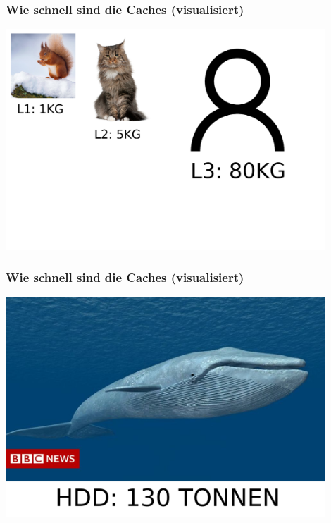 \documentclass{beamer}
\begin{document}
\begin{frame}
\frametitle{Wie schnell sind die Caches (visualisiert)}
\centerline{\includegraphics[width=12cm]{sizes3.png}}
\end{frame}

\begin{frame}
\frametitle{Wie schnell sind die Caches (visualisiert)}
\centerline{\includegraphics[width=12cm]{sizes4.png}}
\end{frame}

{
%
\begin{frame}
\end{frame}
}
\end{document}

